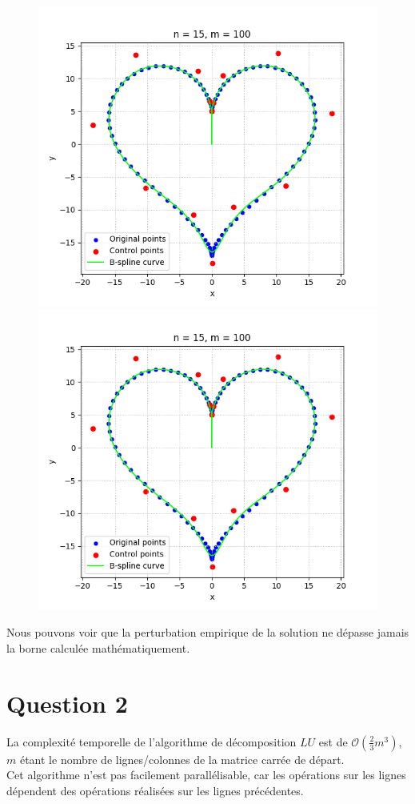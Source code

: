 \documentclass[11pt]{article}
\begin{document}
\begin{figure}[H]
    \includegraphics[scale=0.5]{../../Devoir1/rapport/images/coeur1.png}
    \includegraphics[scale=0.5]{../../Devoir1/rapport/images/coeur1.png}
\end{figure}
Nous pouvons voir que la perturbation empirique de la solution ne dépasse jamais la borne calculée mathématiquement.


\section*{Question 2}
La complexité temporelle de l'algorithme de décomposition $LU$ est de $\mathcal{O}(\frac{2}{3}m^3)$, $m$ étant le nombre de lignes/colonnes de la matrice carrée de départ.\\
Cet algorithme n'est pas facilement parallélisable, car les opérations sur les lignes dépendent des opérations réalisées sur les lignes précédentes.
\end{document}
